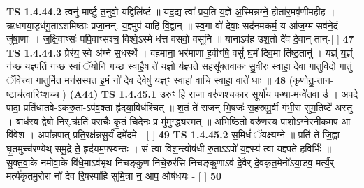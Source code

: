 \documentclass[17pt]{extarticle}
\begin{document}
                  \newline
                                \textbf{ TS 1.4.44.2} \newline
                  त्वनु॑ मार्ष्टु त॒नुवो॒ यद्विलि॑ष्टं ॥ यद॒द्य त्वा᳚ प्रय॒ति य॒ज्ञे अ॒स्मिन्नग्ने॒ होता॑र॒मवृ॑णीमही॒ह । ऋध॑गया॒डृध॑गु॒ताऽश॑मिष्ठाः प्रजा॒नन्. य॒ज्ञ्मुप॑ याहि वि॒द्वान् ॥ स्व॒गा वो॑ देवाः॒ सद॑नमकर्म॒ य आ॑ज॒ग्म सव॑ने॒दं जु॑षा॒णाः । ज॒क्षि॒वाꣳसः॑ पपि॒वाꣳस॑श्च॒ विश्वे॒ऽस्मे ध॑त्त वसवो॒ वसू॑नि ॥ यानाऽव॑ह उश॒तो दे॑व दे॒वान् तान्-[ ] \textbf{  47} \newline
                  \newline
                                \textbf{ TS 1.4.44.3} \newline
                  प्रेर॑य॒ स्वे अ॑ग्ने स॒धस्थे᳚ । वह॑माना॒ भर॑माणा ह॒वीꣳषि॒ वसुं॑ घ॒र्मं दिव॒मा ति॑ष्ठ॒तानु॑ । यज्ञ्॑ य॒ज्ञ्ं ग॑च्छ य॒ज्ञ्प॑तिं गच्छ॒ स्वां ॅयोनिं॑ गच्छ॒ स्वाहै॒ष ते॑ य॒ज्ञो य॑ज्ञ्पते स॒हसू᳚क्तवाकः सु॒वीरः॒ स्वाहा॒ देवा॑ गातुविदो गा॒तुं ॅवि॒त्त्वा गा॒तुमि॑त॒ मन॑सस्पत इ॒मं नो॑ देव दे॒वेषु॑ य॒ज्ञ्ꣳ स्वाहा॑ वा॒चि स्वाहा॒ वाते॑ धाः ॥ \textbf{  48} \newline
                  \newline
                      (कृ॒णो॒तु॒-तान॒-ष्टाच॑त्वारिꣳशच्च )  \textbf{(A44)} \newline \newline
                                        \textbf{ TS 1.4.45.1} \newline
                  उ॒रुꣳ हि राजा॒ वरु॑णश्च॒कार॒ सूर्या॑य॒ पन्था॒-मन्वे॑त॒वा उ॑ । अ॒पदे॒ पादा॒ प्रति॑धातवे-ऽकरु॒ता-ऽप॑व॒क्ता हृ॑दया॒विध॑श्चित् ॥ श॒तं ते॑ राजन् भि॒षजः॑ स॒हस्र॑मु॒र्वी गं॑भी॒रा सु॑म॒तिष्टे॑ अस्तु । बाध॑स्व॒ द्वेषो॒ निर्.ऋ॑तिं परा॒चैः कृ॒तं चि॒देनः॒ प्र मु॑मुग्द्ध्य॒स्मत् ॥ अ॒भिष्ठि॑तो॒ वरु॑णस्य॒ पाशो॒ऽग्नेरनी॑कम॒प आ वि॑वेश । अपा᳚न्नपात् प्रति॒रक्ष॑न्नसु॒र्यं॑ दमे॑दमे - [ ] \textbf{  49} \newline
                  \newline
                                \textbf{ TS 1.4.45.2} \newline
                  स॒मिधं॑ ॅयक्ष्यग्ने ॥ प्रति॑ ते जि॒ह्वा घृ॒तमुच्च॑रण्येथ् समु॒द्रे ते॒ हृद॑यम॒फ्स्व॑न्तः । सं त्वा॑ विश॒न्त्वोष॑धी-रु॒ताऽऽपो॑ य॒ज्ञ्स्य॑ त्वा यज्ञ्पते ह॒विर्भिः॑ ॥ सू॒क्त॒वा॒के न॑मोवा॒के वि॑धे॒माऽव॑भृथ निचङ्कुण निचे॒रुर॑सि निचङ्कु॒णाऽव॑ दे॒वैर् दे॒वकृ॑त॒मेनो॑ऽया॒डव॒ मर्त्यै॒र् मर्त्य॑कृतमु॒रोरा नो॑ देव रि॒षस्पा॑हि सुमि॒त्रा न॒ आप॒ ओष॑धयः - [ ] \textbf{  50} \newline
                  \newline
\end{document}
